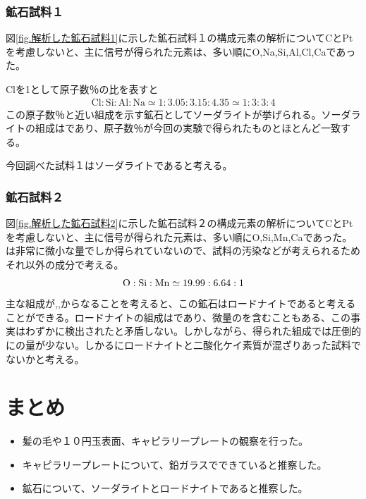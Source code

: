 \documentclass[titlepage,fontsize=10.5pt]{jlreq}
\begin{document}
    \subsubsection{鉱石試料１} %
    \label{ssub:鉱石試料１}
    図\ref{fig.解析した鉱石試料1}に示した鉱石試料１の構成元素の解析についてCとPtを考慮しないと、主に信号が得られた元素は、多い順にO,Na,Si,Al,Cl,Caであった。

    Clを1として原子数％の比を表すと
    \begin{align}
        \mathrm{Cl}:\mathrm{Si}:\mathrm{Al}:\mathrm{Na} \simeq 1:3.05:3.15:4.35 \simeq 1:3:3:4
    \end{align}
    この原子数％と近い組成を示す鉱石としてソーダライトが挙げられる。ソーダライトの組成はであり、原子数％が今回の実験で得られたものとほとんど一致する。

    今回調べた試料１はソーダライトであると考える。

    \subsubsection{鉱石試料２} %
    \label{ssub:鉱石試料２}
    図\ref{fig.解析した鉱石試料2}に示した鉱石試料２の構成元素の解析についてCとPtを考慮しないと、主に信号が得られた元素は、多い順にO,Si,Mn,Caであった。は非常に微小な量でしか得られていないので、試料の汚染などが考えられるためそれ以外の成分で考える。
    \begin{align}
        \ce{O}:\ce{Si}:\ce{Mn} \simeq 19.99:6.64:1
    \end{align}
    主な組成が,,からなることを考えると、この鉱石はロードナイトであると考えることができる。ロードナイトの組成はであり、微量のを含むこともある、この事実はわずかに検出されたと矛盾しない。しかしながら、得られた組成では圧倒的にの量が少ない。しかるにロードナイトと二酸化ケイ素質が混ざりあった試料でないかと考える。

\section{まとめ}%
    \begin{itemize}
        \item 髪の毛や１０円玉表面、キャピラリープレートの観察を行った。
        \item キャピラリープレートについて、鉛ガラスでできていると推察した。
        \item 鉱石について、ソーダライトとロードナイトであると推察した。
    \end{itemize}
\end{document}
